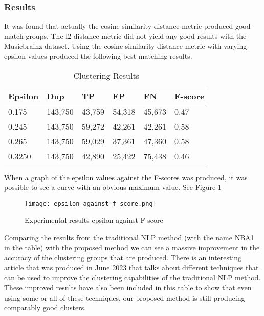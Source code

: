\documentclass{article}
\begin{document}
\subsubsection{Results}
It was found that actually the cosine similarity distance metric produced good match groups. The l2 distance metric did not yield any good results with the Musicbrainz dataset. Using the cosine similarity distance metric with varying epsilon values produced the following best matching results.

\begin{table}[h]
 \caption{Clustering Results}
  \begin{tabular}{|l|l|l|l|l|l|}
    \hline
    \textbf{Epsilon} & \textbf{Dup} & \textbf{TP} & \textbf{FP} & \textbf{FN} & \textbf{F-score} \\
    \hline\hline
    0.175 & 143,750 & 43,759 & 54,318 & 45,673 & 0.47 \\
    \hline
    0.245 & 143,750 & 59,272 & 42,261 & 42,261 & 0.58 \\
    \hline
    0.265 & 143,750 & 59,029 & 37,361 & 47,360 & 0.58 \\
    \hline
    0.3250 & 143,750 & 42,890 & 25,422 & 75,438 & 0.46 \\
    \hline
  \end{tabular}
  \label{tab:proposedmethodtable}
\end{table}

When a graph of the epsilon values against the F-scores was produced, it was possible to see a curve with an obvious maximum value. See Figure \ref{fig:epsilonagainstfscore}
\begin{figure}[h]
\texttt{[image: epsilon\_against\_f\_score.png]}
\caption{Experimental results epsilon against F-score}
\label{fig:epsilonagainstfscore}
\end{figure} %

Comparing the results from the traditional NLP method (with the name NBA1 in the table) with the proposed method we can see a massive improvement in the accuracy of the clustering groups that are produced. There is an interesting article that was produced in June 2023 \cite{improvingClustering} that talks about different techniques that can be used to improve the clustering capabilities of the traditional NLP method. These improved results have also been included in this table to show that even using some or all of these techniques, our proposed method is still producing comparably good clusters.
\end{document}
